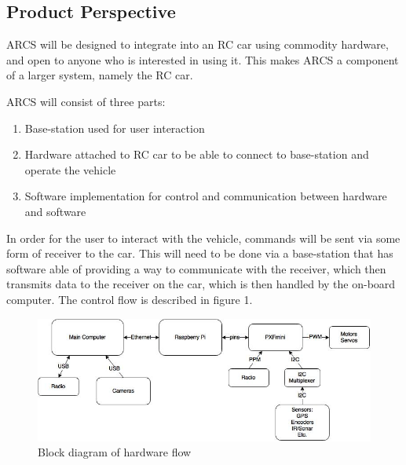 \documentclass[compsoc,draftclsnofoot,onecolumn,10pt]{IEEEtran}
\begin{document}

\subsection{Product Perspective} %
ARCS will be designed to integrate into an RC car using commodity hardware, and open to anyone who is interested in using it. This 
makes ARCS a component of a larger system, namely the RC car. \par
ARCS will consist of three parts: 
\begin{enumerate}
	\item Base-station used for user interaction
	\item Hardware attached to RC car to be able to connect to base-station and 
		operate the vehicle
	\item Software implementation for control and communication between hardware and software
\end{enumerate}
In order for the user to interact with the vehicle, commands will be sent via some form
of receiver to the car. This will need to be done via a base-station that has software able of
providing a way to communicate with the receiver, which then transmits data to the receiver on 
the car, which is then handled by the on-board computer. 
The control flow is described in figure 1. \\

\begin{figure}
  \centering
  \includegraphics[width=\textwidth]{Block_Diagram.jpg}
  \caption{Block diagram of hardware flow}
\end{figure}
\end{document}
